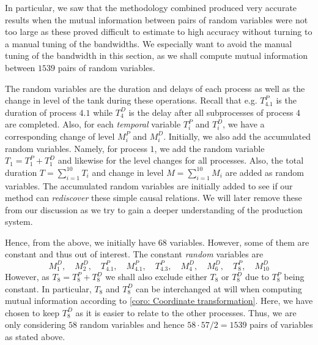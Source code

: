 \documentclass[../Thesis.tex]{subfiles}
\begin{document}
In particular, we saw that the methodology combined produced very accurate results when the mutual information between pairs of random variables were not too large as these proved difficult to estimate to high accuracy without turning to a manual tuning of the bandwidths. We especially want to avoid the manual tuning of the bandwidth in this section, as we shall compute mutual information between $1539$ pairs of random variables.

The random variables are the duration and delays of each process as well as the change in level of the tank during these operations. Recall that e.g. $T^P_{4.1}$ is the duration of process $4.1$ while $T^D_{4}$ is the delay after all subprocesses of process $4$ are completed. Also, for each \textit{temporal} variable $T^P_i$ and $T^D_i$, we have a corresponding change of level $M^P_i$ and $M^D_i$. Initially, we also add the accumulated random variables. Namely, for process $1$, we add the random variable $T_1 = T^P_1 + T^D_1$ and likewise for the level changes for all processes. Also, the total duration $T = \sum_{i=1}^{10} T_i$ and change in level $M = \sum_{i=1}^{10} M_i$ are added as random variables. The accumulated random variables are initially added to see if our method can \textit{rediscover} these simple causal relations. We will later remove these from our discussion as we try to gain a deeper understanding of the production system.

Hence, from the above, we initially have $68$ variables. However, some of them are constant and thus out of interest. The constant \textit{random} variables are
$$M^D_1,\quad  M^D_2,\quad T^P_{4.1},\quad  M^P_{4.1},\quad T^P_{4.3},\quad  M^D_4,\quad  M^D_6,\quad  T^P_8,\quad  M^D_{10}$$
However, as $T_8 = T^P_8 + T^D_8$ we shall also exclude either $T_8$ or $T^D_8$ due to $T^P_8$ being constant. In particular, $T_8$ and $T^D_8$ can be interchanged at will when computing mutual information according to \autoref{coro: Coordinate transformation}. Here, we have chosen to keep $T^D_8$ as it is easier to relate to the other processes. Thus, we are only considering $58$ random variables and hence $58 \cdot 57 / 2 = 1539$ pairs of variables as stated above.
\end{document}
